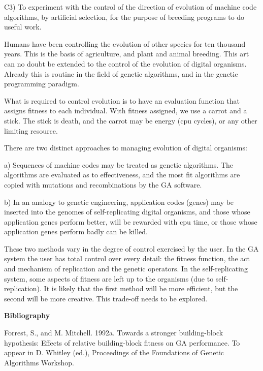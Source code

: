 \pagebreak

\XP
C3) To experiment with the control of the direction of evolution of machine
code algorithms, by artificial selection, for the purpose of breeding programs
to do useful work.
\eXP

Humans have been controlling the evolution of other species for ten thousand
years.  This is the basis of agriculture, and plant and animal breeding.  This
art can no doubt be extended to the control of the evolution of digital
organisms.  Already this is routine in the field of genetic algorithms, and
in the genetic programming paradigm.

What is required to control evolution is to have an evaluation function
that assigns fitness to each individual.  With fitness assigned, we use
a carrot and a stick.  The stick is death, and the carrot may be energy (cpu
cycles), or any other limiting resource.

There are two distinct approaches to managing evolution of digital organisms:

\XP
a) Sequences of machine codes may be treated as genetic algorithms.  The 
algorithms are evaluated as to effectiveness, and the most fit algorithms
are copied with mutations and recombinations by the GA software.

b) In an analogy to genetic engineering, application codes (genes) may be
inserted into the genomes of self-replicating digital organisms, and those
whose application genes perform better, will be rewarded with cpu time, or
those whose application genes perform badly can be killed.
\eXP

These two methods vary in the degree of control exercised by the user.
In the GA system the user has total control over every detail: the fitness
function, the act and mechanism of replication and the genetic operators.
In the self-replicating system, some aspects of fitness are left up to the
organisms (due to self-replication).  It is likely that the first method
will be more efficient, but the second will be more creative.  This
trade-off needs to be explored.

\newpage

\begin{center}
\large \bf Bibliography\rm \normalsize\vspace{12pt}\\
\end{center}

\XP

Forrest, S., and M. Mitchell.  1992a.  Towards a stronger building-block
hypothesis: Effects of relative building-block fitness on GA performance.
To appear in D. Whitley (ed.), Proceedings of the Foundations of Genetic
Algorithms Workshop.

